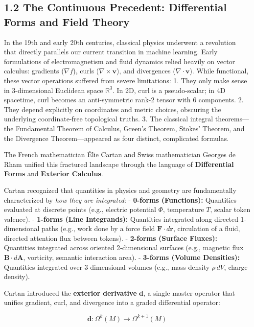 \documentclass[11pt,twoside,openright]{amsbook}
\begin{document}
\subsection{1.2 The Continuous Precedent: Differential Forms and Field Theory}

In the 19th and early 20th centuries, classical physics underwent a revolution that directly parallels our current transition in machine learning. Early formulations of electromagnetism and fluid dynamics relied heavily on vector calculus: gradients ($\nabla f$), curls ($\nabla \times \mathbf{v}$), and divergences ($\nabla \cdot \mathbf{v}$). While functional, these vector operations suffered from severe limitations:
1. They only make sense in 3-dimensional Euclidean space $\mathbb{R}^3$. In 2D, curl is a pseudo-scalar; in 4D spacetime, curl becomes an anti-symmetric rank-2 tensor with 6 components.
2. They depend explicitly on coordinates and metric choices, obscuring the underlying coordinate-free topological truths.
3. The classical integral theorems—the Fundamental Theorem of Calculus, Green's Theorem, Stokes' Theorem, and the Divergence Theorem—appeared as four distinct, complicated formulas.

The French mathematician Élie Cartan and Swiss mathematician Georges de Rham unified this fractured landscape through the language of \textbf{Differential Forms} and \textbf{Exterior Calculus}. 

Cartan recognized that quantities in physics and geometry are fundamentally characterized by \textit{how they are integrated}:
- \textbf{0-forms (Functions):} Quantities evaluated at discrete points (e.g., electric potential $\Phi$, temperature $T$, scalar token valence).
- \textbf{1-forms (Line Integrands):} Quantities integrated along directed 1-dimensional paths (e.g., work done by a force field $\mathbf{F} \cdot d\mathbf{r}$, circulation of a fluid, directed attention flux between tokens).
- \textbf{2-forms (Surface Fluxes):} Quantities integrated across oriented 2-dimensional surfaces (e.g., magnetic flux $\mathbf{B} \cdot d\mathbf{A}$, vorticity, semantic interaction area).
- \textbf{3-forms (Volume Densities):} Quantities integrated over 3-dimensional volumes (e.g., mass density $\rho \, dV$, charge density).

Cartan introduced the \textbf{exterior derivative} $\mathbf{d}$, a single master operator that unifies gradient, curl, and divergence into a graded differential operator:

$$\mathbf{d} : \Omega^k(M) \to \Omega^{k+1}(M)$$
\end{document}
